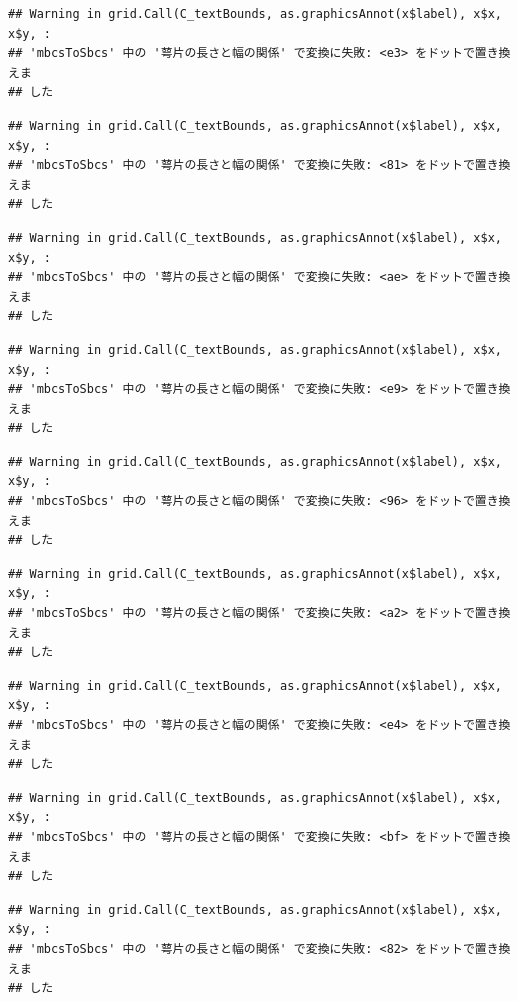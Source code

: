 \documentclass[
]{book}
\begin{document}
\begin{verbatim}
## Warning in grid.Call(C_textBounds, as.graphicsAnnot(x$label), x$x, x$y, :
## 'mbcsToSbcs' 中の '萼片の長さと幅の関係' で変換に失敗: <e3> をドットで置き換えま
## した
\end{verbatim}

\begin{verbatim}
## Warning in grid.Call(C_textBounds, as.graphicsAnnot(x$label), x$x, x$y, :
## 'mbcsToSbcs' 中の '萼片の長さと幅の関係' で変換に失敗: <81> をドットで置き換えま
## した
\end{verbatim}

\begin{verbatim}
## Warning in grid.Call(C_textBounds, as.graphicsAnnot(x$label), x$x, x$y, :
## 'mbcsToSbcs' 中の '萼片の長さと幅の関係' で変換に失敗: <ae> をドットで置き換えま
## した
\end{verbatim}

\begin{verbatim}
## Warning in grid.Call(C_textBounds, as.graphicsAnnot(x$label), x$x, x$y, :
## 'mbcsToSbcs' 中の '萼片の長さと幅の関係' で変換に失敗: <e9> をドットで置き換えま
## した
\end{verbatim}

\begin{verbatim}
## Warning in grid.Call(C_textBounds, as.graphicsAnnot(x$label), x$x, x$y, :
## 'mbcsToSbcs' 中の '萼片の長さと幅の関係' で変換に失敗: <96> をドットで置き換えま
## した
\end{verbatim}

\begin{verbatim}
## Warning in grid.Call(C_textBounds, as.graphicsAnnot(x$label), x$x, x$y, :
## 'mbcsToSbcs' 中の '萼片の長さと幅の関係' で変換に失敗: <a2> をドットで置き換えま
## した
\end{verbatim}

\begin{verbatim}
## Warning in grid.Call(C_textBounds, as.graphicsAnnot(x$label), x$x, x$y, :
## 'mbcsToSbcs' 中の '萼片の長さと幅の関係' で変換に失敗: <e4> をドットで置き換えま
## した
\end{verbatim}

\begin{verbatim}
## Warning in grid.Call(C_textBounds, as.graphicsAnnot(x$label), x$x, x$y, :
## 'mbcsToSbcs' 中の '萼片の長さと幅の関係' で変換に失敗: <bf> をドットで置き換えま
## した
\end{verbatim}

\begin{verbatim}
## Warning in grid.Call(C_textBounds, as.graphicsAnnot(x$label), x$x, x$y, :
## 'mbcsToSbcs' 中の '萼片の長さと幅の関係' で変換に失敗: <82> をドットで置き換えま
## した
\end{verbatim}
\end{document}
